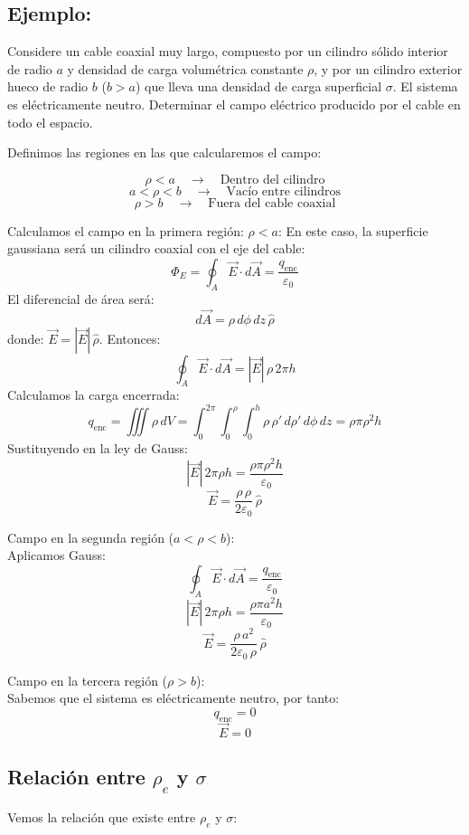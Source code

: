 \documentclass[a4paper,12pt]{article}
\begin{document}
\subsection*{Ejemplo:}
\noindent
Considere un cable coaxial muy largo, compuesto por un cilindro sólido interior de radio \(a\) y densidad de carga volumétrica constante \(\rho\), y por un cilindro exterior hueco de radio \(b\) (\(b > a\)) que lleva una densidad de carga superficial \(\sigma\). El sistema es eléctricamente neutro. Determinar el campo eléctrico producido por el cable en todo el espacio.

\medskip
\noindent
Definimos las regiones en las que calcularemos el campo:

\[
\rho < a \quad \rightarrow \quad \text{Dentro del cilindro}
\]
\[
a < \rho < b \quad \rightarrow \quad \text{Vacío entre cilindros}
\]
\[
\rho > b \quad \rightarrow \quad \text{Fuera del cable coaxial}
\]

\noindent
Calculamos el campo en la primera región: \(\rho < a\):
\noindent
En este caso, la superficie gaussiana será un cilindro coaxial con el eje del cable:
\[
\Phi_E = \oint_{A} \vec E \cdot d\vec A = \frac{q_{\text{enc}}}{\varepsilon_0}
\]
El diferencial de área será:
\[
d\vec{A} = \rho\, d\phi\, dz \, \hat{\rho}
\]
donde: \qquad\(\vec{E} = |\vec{E}|\,\hat{\rho}\).
\newpage
\noindent
Entonces:
\[
\oint_{A} \vec{E}\cdot d\vec{A} = |\vec{E}|\,\rho\, 2\pi h
\]
Calculamos la carga encerrada:
\[
q_{\text{enc}} = \iiint \rho\, dV = \int_{0}^{2\pi}\!\!\int_{0}^{\rho}\!\!\int_{0}^{h} \rho\, \rho'\, d\rho'\, d\phi\, dz
= \rho \pi \rho^{2} h
\]
Sustituyendo en la ley de Gauss:
\[
|\vec{E}|\, 2\pi \rho h = \frac{\rho \pi \rho^{2} h}{\varepsilon_0}
\]
\[
\boxed{\vec{E} = \frac{\rho\,\rho}{2\varepsilon_0}\,\hat{\rho}}
\]

\medskip
\noindent
Campo en la segunda región (\(a < \rho < b\)):\\
\noindent
Aplicamos Gauss:
\[
\oint_{A} \vec{E}\cdot d\vec{A} = \frac{q_{\text{enc}}}{\varepsilon_0}
\]
\[
|\vec{E}|\, 2\pi \rho h = \frac{\rho \pi a^{2} h}{\varepsilon_0}
\]
\[
\boxed{\vec{E} = \frac{\rho\,a^{2}}{2\varepsilon_0\,\rho}\,\hat{\rho}}
\]

\medskip
\noindent
Campo en la tercera región (\(\rho > b\)):\\
\noindent
Sabemos que el sistema es eléctricamente neutro, por tanto:
\[
q_{\text{enc}} = 0
\]
\[
\boxed{\vec{E} = 0}
\]
\subsection*{Relación entre \(\rho_e\) y \(\sigma\)}
\noindent
Vemos la relación que existe entre \(\rho_e\) y \(\sigma\):
\end{document}
